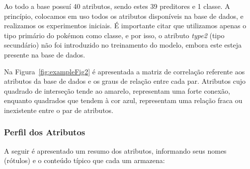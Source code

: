 \documentclass[12pt]{article}
\begin{document}
Ao todo a base possuí 40 atributos, sendo estes 39 preditores e 1 classe. A princípio, colocamos em uso todos os atributos disponíveis na base de dados, e realizamos os experimentos iniciais. É importante citar que utilizamos apenas o tipo primário do pokémon como classe, e por isso, o atributo \emph{type2} (tipo secundário) não foi introduzido no treinamento do modelo, embora este esteja presente na base de dados.

Na Figura~\ref{fig:exampleFig2} é apresentada a matriz de correlação referente aos atributos da base de dados e os graus de relação entre cada par. Atributos cujo quadrado de interseção tende ao amarelo, representam uma forte conexão, enquanto quadrados que tendem à cor azul, representam uma relação fraca ou inexistente entre o par de atributos.

\subsubsection{Perfil dos Atributos}

A seguir é apresentado um resumo dos atributos, informando seus nomes (rótulos) e o conteúdo típico que cada um armazena:
\end{document}
